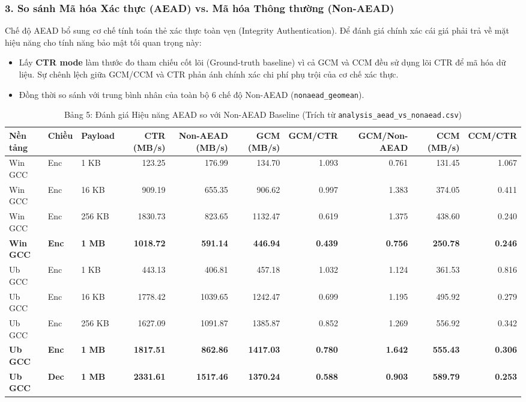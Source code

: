\documentclass[12pt, a4paper]{report}
\begin{document}
\subsubsection{3. So sánh Mã hóa Xác thực (AEAD) vs. Mã hóa Thông thường (Non-AEAD)}

Chế độ AEAD bổ sung cơ chế tính toán thẻ xác thực toàn vẹn (Integrity Authentication). Để đánh giá chính xác cái giá phải trả về mặt hiệu năng cho tính năng bảo mật tối quan trọng này:
\begin{itemize}
    \item Lấy \textbf{CTR mode} làm thước đo tham chiếu cốt lõi (Ground-truth baseline) vì cả GCM và CCM đều sử dụng lõi CTR để mã hóa dữ liệu. Sự chênh lệch giữa GCM/CCM và CTR phản ánh chính xác chi phí phụ trội của cơ chế xác thực.
    \item Đồng thời so sánh với trung bình nhân của toàn bộ 6 chế độ Non-AEAD (\texttt{nonaead\_geomean}).
\end{itemize}

\begin{table}[H]
\centering
\scriptsize
\caption{Bảng 5: Đánh giá Hiệu năng AEAD so với Non-AEAD Baseline (Trích từ \texttt{analysis\_aead\_vs\_nonaead.csv})}
\label{tab:aead_vs_nonaead}
\begin{tabular}{lllrrrrrrr}
\toprule
\textbf{Nền tảng} & \textbf{Chiều} & \textbf{Payload} & \textbf{CTR (MB/s)} & \textbf{Non-AEAD (MB/s)} & \textbf{GCM (MB/s)} & \textbf{GCM/CTR} & \textbf{GCM/Non-AEAD} & \textbf{CCM (MB/s)} & \textbf{CCM/CTR} \\
\midrule
Win GCC & Enc & 1 KB & 123.25 & 176.99 & 134.70 & 1.093 & 0.761 & 131.45 & 1.067 \\
Win GCC & Enc & 16 KB & 909.19 & 655.35 & 906.62 & 0.997 & 1.383 & 374.05 & 0.411 \\
Win GCC & Enc & 256 KB & 1830.73 & 823.65 & 1132.47 & 0.619 & 1.375 & 438.60 & 0.240 \\
\textbf{Win GCC} & \textbf{Enc} & \textbf{1 MB} & \textbf{1018.72} & \textbf{591.14} & \textbf{446.94} & \textbf{0.439} & \textbf{0.756} & \textbf{250.78} & \textbf{0.246} \\
Ub GCC & Enc & 1 KB & 443.13 & 406.81 & 457.18 & 1.032 & 1.124 & 361.53 & 0.816 \\
Ub GCC & Enc & 16 KB & 1778.42 & 1039.65 & 1242.47 & 0.699 & 1.195 & 495.92 & 0.279 \\
Ub GCC & Enc & 256 KB & 1627.09 & 1091.87 & 1385.87 & 0.852 & 1.269 & 556.92 & 0.342 \\
\textbf{Ub GCC} & \textbf{Enc} & \textbf{1 MB} & \textbf{1817.51} & \textbf{862.86} & \textbf{1417.03} & \textbf{0.780} & \textbf{1.642} & \textbf{555.43} & \textbf{0.306} \\
\textbf{Ub GCC} & \textbf{Dec} & \textbf{1 MB} & \textbf{2331.61} & \textbf{1517.46} & \textbf{1370.24} & \textbf{0.588} & \textbf{0.903} & \textbf{589.79} & \textbf{0.253} \\
\bottomrule
\end{tabular}
\end{table}
\end{document}
